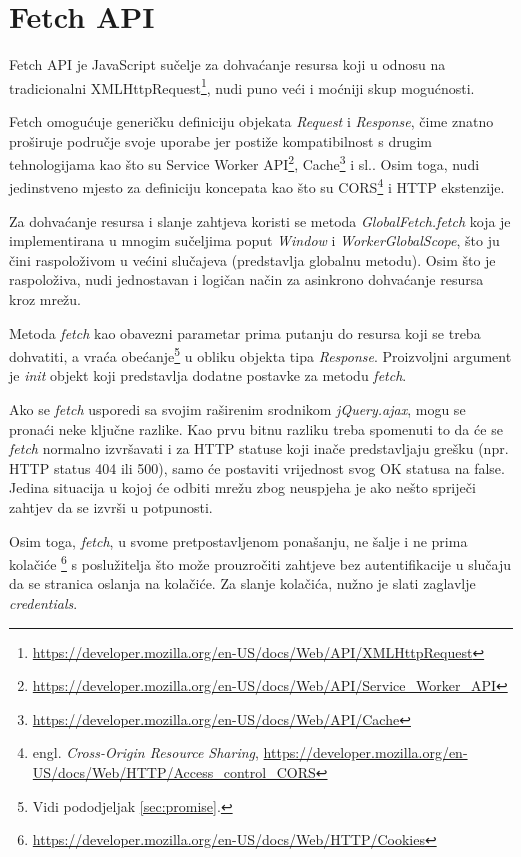 \documentclass[times, utf8, zavrsni, numeric]{fer}
\newcommand{\razmakp}{\vspace{18pt}}
\begin{document}
\newpage


\section{Fetch API}

Fetch API je JavaScript sučelje za dohvaćanje resursa koji u odnosu na tradicionalni XMLHttpRequest\footnote{\url{https://developer.mozilla.org/en-US/docs/Web/API/XMLHttpRequest}}, nudi puno veći i moćniji skup mogućnosti.

Fetch omogućuje generičku definiciju objekata \emph{Request} i \emph{Response}, čime znatno proširuje područje svoje uporabe jer postiže kompatibilnost s drugim tehnologijama kao što su Service Worker API\footnote{\url{https://developer.mozilla.org/en-US/docs/Web/API/Service_Worker_API}}, Cache\footnote{\url{https://developer.mozilla.org/en-US/docs/Web/API/Cache}} i sl.\citep{MDNFetch}.
Osim toga, nudi jedinstveno mjesto za definiciju koncepata kao što su CORS\footnote{engl. \emph{Cross-Origin Resource Sharing}, \url{https://developer.mozilla.org/en-US/docs/Web/HTTP/Access_control_CORS}} i HTTP ekstenzije.

\razmakp

Za dohvaćanje resursa i slanje zahtjeva koristi se metoda \emph{GlobalFetch.fetch} koja je implementirana u mnogim sučeljima poput \emph{Window} i \emph{WorkerGlobalScope}, što ju čini raspoloživom u većini slučajeva (predstavlja globalnu metodu).
Osim što je raspoloživa, nudi jednostavan i logičan način za asinkrono dohvaćanje resursa kroz mrežu.

Metoda \emph{fetch} kao obavezni parametar prima putanju do resursa koji se treba dohvatiti, a vraća obećanje\footnote{Vidi pododjeljak \ref{sec:promise}.} u obliku objekta tipa \emph{Response}.
Proizvoljni argument je \emph{init} objekt koji predstavlja dodatne postavke za metodu \emph{fetch}\citep{MDNUsingFetch}.

\razmakp

Ako se \emph{fetch} usporedi sa svojim raširenim srodnikom \emph{jQuery.ajax}, mogu se pronaći neke ključne razlike. 
Kao prvu bitnu razliku treba spomenuti to da će se \emph{fetch} normalno izvršavati i za HTTP statuse koji inače predstavljaju grešku (npr. HTTP status 404 ili 500), samo će postaviti vrijednost svog OK statusa na false.
Jedina situacija u kojoj će odbiti mrežu zbog neuspjeha je ako nešto spriječi zahtjev da se izvrši u potpunosti.

Osim toga, \emph{fetch}, u svome pretpostavljenom ponašanju, ne šalje i ne prima kolačiće \footnote{\url{https://developer.mozilla.org/en-US/docs/Web/HTTP/Cookies}} s poslužitelja što može prouzročiti zahtjeve bez autentifikacije u slučaju da se stranica oslanja na kolačiće.
Za slanje kolačića, nužno je slati zaglavlje \emph{credentials}.
\end{document}
